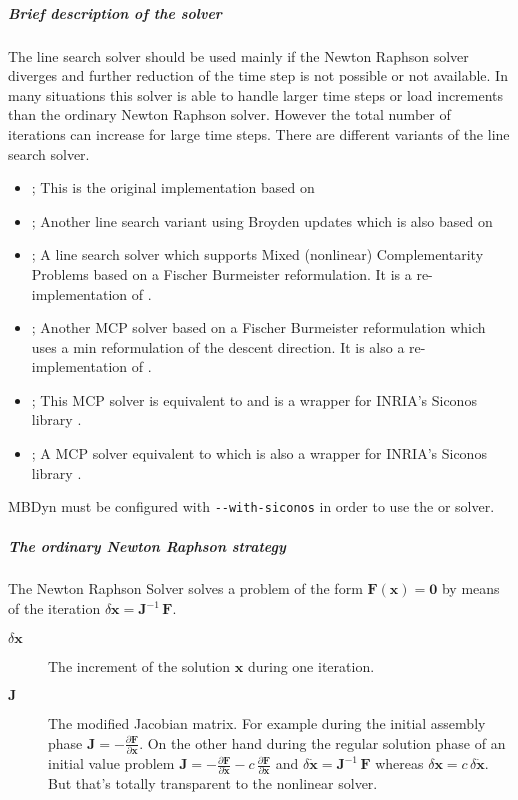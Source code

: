 \subparagraph{Brief description of the solver}
The line search solver should be used mainly if the Newton Raphson solver diverges and further reduction of the time step is not possible or not available. In many situations this solver is able to handle larger time steps or load increments than the ordinary Newton Raphson solver. However the total number of iterations can increase for large time steps.
There are different variants of the line search solver.
\begin{itemize}
\item {}; This is the original implementation based on \cite{NUMERICAL-RECIPES-IN-C}
\item {}; Another line search variant using Broyden updates which is also based on \cite{NUMERICAL-RECIPES-IN-C}
\item {}; A line search solver which supports Mixed (nonlinear) Complementarity Problems based on a Fischer Burmeister reformulation. It is a re-implementation of \cite{SICONOS-WEBSITE}.
\item {}; Another MCP solver based on a Fischer Burmeister reformulation which uses a min reformulation of the descent direction. It is also a re-implementation of \cite{SICONOS-WEBSITE}.
\item {}; This MCP solver is equivalent to  and is a wrapper for INRIA's Siconos library \cite{SICONOS-WEBSITE}.
\item {}; A MCP solver equivalent to  which is also a wrapper for INRIA's Siconos library \cite{SICONOS-WEBSITE}.
\end{itemize}
MBDyn must be configured with \verb;--with-siconos; in order to use the  or  solver.

\subparagraph{The ordinary Newton Raphson strategy}
The Newton Raphson Solver solves a problem of the form $\boldsymbol{F}\left(\boldsymbol{x}\right)=\boldsymbol{0}$ by means of the iteration $\delta\boldsymbol{x}=\boldsymbol{J}^{-1}\,\boldsymbol{F}$.

\begin{description}
\item[$\delta\boldsymbol{x}$] The increment of the solution $\boldsymbol{x}$ during one iteration.
\item[$\boldsymbol{J}$] The modified Jacobian matrix. 
For example during the initial assembly phase $\boldsymbol{J}=-\frac{\partial \boldsymbol{F}}{\partial \boldsymbol{x}}$. 
On the other hand during the regular solution phase of an initial value problem $\boldsymbol{J}=-\frac{\partial \boldsymbol{F}}{\partial \dot{\boldsymbol{x}}}-c\,\frac{\partial \boldsymbol{F}}{\partial \boldsymbol{x}}$
and $\delta\dot{\boldsymbol{x}}=\boldsymbol{J}^{-1}\,\boldsymbol{F}$ whereas $\delta\boldsymbol{x}=c\,\delta\dot{\boldsymbol{x}}$. But that's totally transparent to the nonlinear solver.
\end{description}


